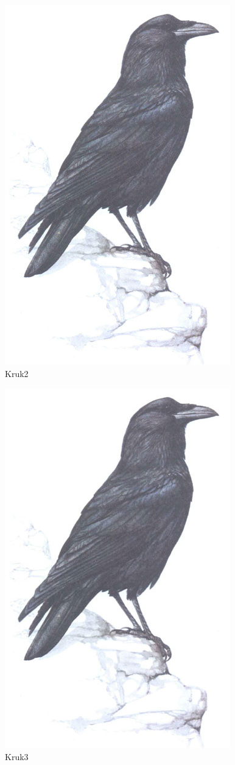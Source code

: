 \documentclass[a4paper,10pt]{report}
\begin{document}
\begin{figure}[b]
\centerline{\includegraphics[scale=0.2]{kruk}}
\caption{Kruk2}
\end{figure}

\begin{figure}[h]
\centerline{\includegraphics[scale=0.2]{kruk}}
\caption{Kruk3}
\end{figure}
\end{document}
